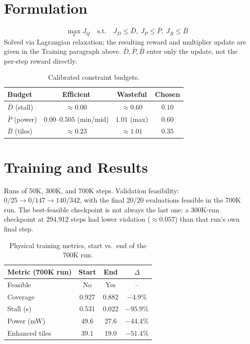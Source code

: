 \documentclass[10pt,conference]{IEEEtran}
\begin{document}
\section{Formulation}
\[
\max_\pi J_Q \quad \text{s.t.} \quad J_D\le\bar D,\ J_P\le\bar P,\ J_B\le\bar B
\]
Solved via Lagrangian relaxation; the resulting reward and multiplier update are given in the Training paragraph above. $\bar D,\bar P,\bar B$ enter only the update, not the per-step reward directly.

\begin{table}[H]
\centering
\footnotesize
\begin{tabular}{lccc}
\toprule
Budget & Efficient & Wasteful & Chosen \\
\midrule
$\bar D$ (stall) & $\approx0.00$ & $\approx0.60$ & $\mathbf{0.10}$ \\
$\bar P$ (power) & $0.00$--$0.505$ (min/mid) & $1.01$ (max) & $\mathbf{0.60}$ \\
$\bar B$ (tiles) & $\approx0.23$ & $\approx1.01$ & $\mathbf{0.35}$ \\
\bottomrule
\end{tabular}
\caption{Calibrated constraint budgets.}
\label{tab:budgets}
\end{table}

\section{Training and Results}
Runs of 50K, 300K, and 700K steps. Validation feasibility: $0/25\to0/147\to140/342$, with the final 20/20 evaluations feasible in the 700K run. The best-feasible checkpoint is not always the last one: a 300K-run checkpoint at 294{,}912 steps had lower violation ($\approx0.057$) than that run's own final step.

\begin{table}[H]
\centering
\footnotesize
\begin{tabular}{lccc}
\toprule
\textbf{Metric (700K run)} & \textbf{Start} & \textbf{End} & \textbf{$\Delta$} \\
\midrule
Feasible & No & Yes & -- \\
Coverage & 0.927 & 0.882 & $-4.9\%$ \\
Stall (s) & 0.531 & 0.022 & $-95.9\%$ \\
Power (mW) & 49.6 & 27.6 & $-44.4\%$ \\
Enhanced tiles & 39.1 & 19.0 & $-51.4\%$ \\
\bottomrule
\end{tabular}
\caption{Physical training metrics, start vs.\ end of the 700K run.}
\label{tab:startend}
\end{table}
\end{document}
